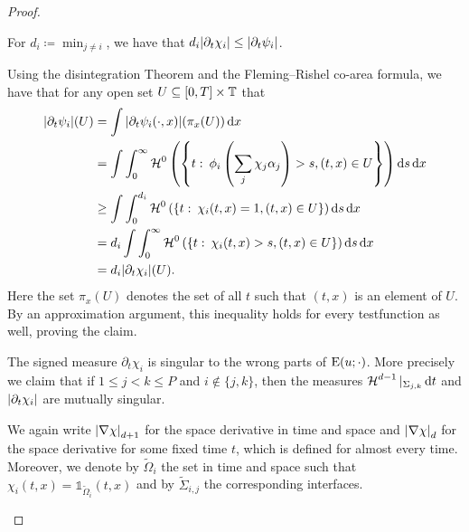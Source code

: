 \begin{proof}
\begin{description}[wide=0pt]
		\item[Step 2:] For $ d_{ i } \coloneqq \min_{ j \neq i } $, we have that $ d_{ i } \abs{ \partial_{ t } \chi_{ i } } \leq \abs{ \partial_{ t } \psi_{ i } } $.
		
		Using the disintegration Theorem \cite[Thm.~3.103]{ambrosio_fusco_pallara_functions_of_bv_and_free_discontinuity_problems} and the Fleming--Rishel co-area formula, we have that for any open set $ U \subseteq [ 0 , T ] \times \operatorname{\mathbb{T}} $ that
		\begin{align*}
			\abs{
				\partial_{ t } \psi_{ i }
			} ( U ) 
			& =
			\int
				\abs{ 
					\partial_{ t } \psi_{ i } ( \cdot , x )
				} ( \pi_{ x } ( U ) ) 
			\dd{ x }
			\\
			& =
			\int
				\int_{ 0 }^{ \infty }
					\operatorname{\mathcal{H}}^{ 0 } \left(
						\left\{
							t 
							\, \colon \,
							\phi_{ i } 
							\left( \sum_{ j } \chi_{ j } \alpha_{ j } \right) > s,
							( t, x ) \in U
						\right\}
					\right)
				\dd{ s }
			\dd{ x }
			\\
			& \geq
			\int
				\int_{ 0 }^{ d_{ i } }
					\operatorname{\mathcal{H}}^{ 0 }
						\left(
							\left\{
								t 
								\, \colon \,
								\chi_{ i } ( t , x ) = 1,
								( t, x ) \in U
							\right\}
						\right)
				\dd{ s }
			\dd{ x }
			\\
			& =
			d_{ i }
			\int
				\int_{ 0 }^{ \infty }
					\operatorname{\mathcal{H}}^{ 0 } \left(
						\left\{
							t 
							\, \colon \,
							\chi_{ i } ( t , x ) > s , ( t , x ) \in U
						\right\}
					\right)
				\dd{ s }
			\dd{ x }
			\\
			& =
			d_{ i }
			\abs{ \partial_{ t } \chi_{ i } } ( U ).
		\end{align*}
		Here the set $ \pi_{ x } ( U ) $ denotes the set of all $ t $ such that $ ( t , x ) $ is an element of $ U $.
		By an approximation argument, this inequality holds for every testfunction as well, proving the claim.
		
		\item[Step 3:] The signed measure $ \partial_{ t } \chi_{ i } $ is singular to the wrong parts of $ \operatorname{E} ( u ; \cdot ) $. More precisely we claim that if $ 1 \leq j < k \leq P $ and $ i \notin \{ j , k \} $, then the measures 
		$ \operatorname{\mathcal{H}}^{ d - 1 } |_{ \Sigma_{ j , k } } \dd{ t } $ and $ \abs{ \partial_{ t } \chi_{ i } } $ are mutually singular.
		
		We again write $ \abs{ \nabla \chi }_{ d + 1 } $ for the space derivative in time and space and $ \abs{ \nabla \chi }_{ d } $ for the space derivative for some fixed time $ t $, which is defined for almost every time. Moreover, we denote by $ \tilde{ \Omega }_{ i } $ the set in time and space such that
		$ \chi_{ i } ( t , x ) = \mathds{ 1 }_{ \tilde{ \Omega }_{ i } } ( t , x ) $
		and by $ \tilde{ \Sigma }_{ i , j } $ the corresponding interfaces.
		

\end{description}
\end{proof}
